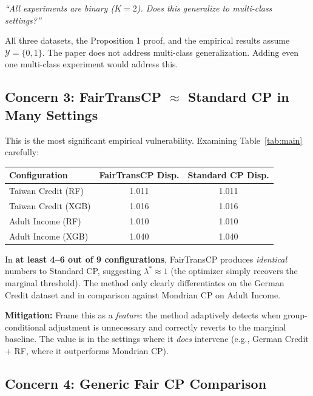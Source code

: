 \documentclass[11pt,a4paper]{article}
\begin{document}
\begin{cautionbox}
\emph{``All experiments are binary ($K=2$). Does this generalize to multi-class settings?''}
\end{cautionbox}

\noindent All three datasets, the Proposition 1 proof, and the empirical results assume $\mathcal{Y} = \{0,1\}$. The paper does not address multi-class generalization. Adding even one multi-class experiment would address this.

\subsection{Concern 3: FairTransCP $\approx$ Standard CP in Many Settings}

\begin{weaknessbox}
This is the most significant empirical vulnerability. Examining Table~\ref{tab:main} carefully:

\begin{center}
\small
\begin{tabular}{@{}lcc@{}}
\toprule
\textbf{Configuration} & \textbf{FairTransCP Disp.} & \textbf{Standard CP Disp.} \\
\midrule
Taiwan Credit (RF) & 1.011 & 1.011 \\
Taiwan Credit (XGB) & 1.016 & 1.016 \\
Adult Income (RF) & 1.010 & 1.010 \\
Adult Income (XGB) & 1.040 & 1.040 \\
\bottomrule
\end{tabular}
\end{center}

In \textbf{at least 4--6 out of 9 configurations}, FairTransCP produces \emph{identical} numbers to Standard CP, suggesting $\lambda^* \approx 1$ (the optimizer simply recovers the marginal threshold). The method only clearly differentiates on the German Credit dataset and in comparison against Mondrian CP on Adult Income.
\end{weaknessbox}

\noindent\textbf{Mitigation:} Frame this as a \emph{feature}: the method adaptively detects when group-conditional adjustment is unnecessary and correctly reverts to the marginal baseline. The value is in the settings where it \emph{does} intervene (e.g., German Credit + RF, where it outperforms Mondrian CP).

\subsection{Concern 4: Generic Fair CP Comparison}
\end{document}
